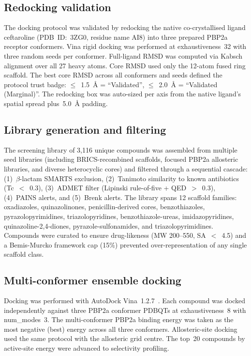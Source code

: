 \documentclass[12pt]{article}
\begin{document}
\subsection{Redocking validation}
The docking protocol was validated by redocking the native co-crystallised ligand ceftaroline (PDB~ID:~3ZG0, residue name AI8) into three prepared PBP2a receptor conformers. Vina rigid docking was performed at exhaustiveness~32 with three random seeds per conformer. Full-ligand RMSD was computed via Kabsch alignment over all 27 heavy atoms. Core RMSD used only the 12-atom fused ring scaffold. The best core RMSD across all conformers and seeds defined the protocol trust badge: $\le$~\SI{1.5}{\angstrom} = ``Validated'', $\le$~\SI{2.0}{\angstrom} = ``Validated (Marginal)''. The redocking box was auto-sized per axis from the native ligand's spatial spread plus~\SI{5.0}{\angstrom} padding.

\subsection{Library generation and filtering}
The screening library of 3,116 unique compounds was assembled from multiple seed libraries (including BRICS-recombined scaffolds, focused PBP2a allosteric libraries, and diverse heterocyclic cores) and filtered through a sequential cascade: (1)~$\beta$-lactam SMARTS exclusion, (2)~Tanimoto similarity to known antibiotics (Tc~$<$~0.3), (3)~ADMET filter (Lipinski rule-of-five + QED~$>$~0.3), (4)~PAINS alerts, and (5)~Brenk alerts. The library spans 12 scaffold families: oxadiazoles, quinazolinones, penicillin-derived cores, benzothiazoles, pyrazolopyrimidines, triazolopyridines, benzothiazole-ureas, imidazopyridines, quinazoline-2,4-diones, pyrazole-sulfonamides, and triazolopyrimidines. Compounds were curated to ensure drug-likeness (MW 200--550, SA~$<$~4.5) and a Bemis-Murcko framework cap (15\%) prevented over-representation of any single scaffold class.

\subsection{Multi-conformer ensemble docking}
Docking was performed with AutoDock Vina~1.2.7~\cite{trott2010}. Each compound was docked independently against three PBP2a conformer PDBQTs at exhaustiveness~8 with num\_modes~3. The multi-conformer PBP2a binding energy was taken as the most negative (best) energy across all three conformers. Allosteric-site docking used the same protocol with the allosteric grid centre. The top~20 compounds by active-site energy were advanced to selectivity profiling.
\end{document}
